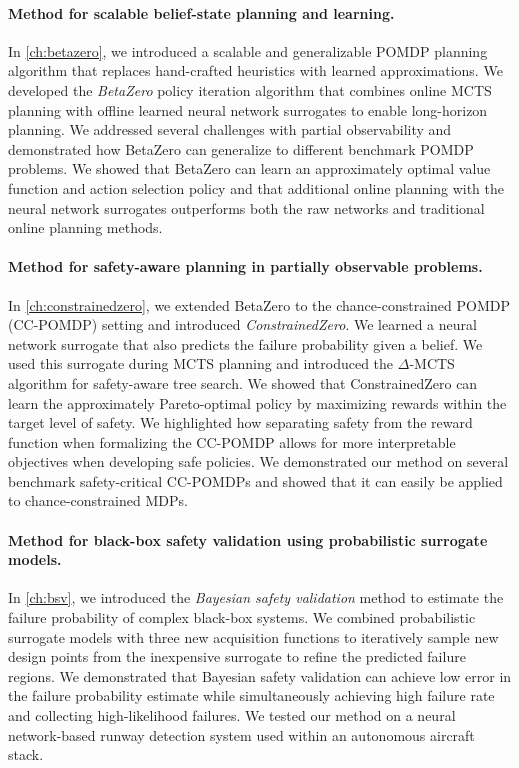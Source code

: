 \paragraph{Method for scalable belief-state planning and learning.}
In \cref{ch:betazero}, we introduced a scalable and generalizable POMDP planning algorithm that replaces hand-crafted heuristics with learned approximations.
We developed the \textit{BetaZero} policy iteration algorithm that combines online MCTS planning with offline learned neural network surrogates to enable long-horizon planning.
We addressed several challenges with partial observability and demonstrated how BetaZero can generalize to different benchmark POMDP problems.
We showed that BetaZero can learn an approximately optimal value function and action selection policy and that additional online planning with the neural network surrogates outperforms both the raw networks and traditional online planning methods.


\paragraph{Method for safety-aware planning in partially observable problems.}
In \cref{ch:constrainedzero}, we extended BetaZero to the chance-constrained POMDP (CC-POMDP) setting and introduced \textit{ConstrainedZero}.
We learned a neural network surrogate that also predicts the failure probability given a belief.
We used this surrogate during MCTS planning and introduced the $\Delta$-MCTS algorithm for safety-aware tree search.
We showed that ConstrainedZero can learn the approximately Pareto-optimal policy by maximizing rewards within the target level of safety.
We highlighted how separating safety from the reward function when formalizing the CC-POMDP allows for more interpretable objectives when developing safe policies.
We demonstrated our method on several benchmark safety-critical CC-POMDPs and showed that it can easily be applied to chance-constrained MDPs.


\paragraph{Method for black-box safety validation using probabilistic surrogate models.}
In \cref{ch:bsv}, we introduced the \textit{Bayesian safety validation} method to estimate the failure probability of complex black-box systems.
We combined probabilistic surrogate models with three new acquisition functions to iteratively sample new design points from the inexpensive surrogate to refine the predicted failure regions.
We demonstrated that Bayesian safety validation can achieve low error in the failure probability estimate while simultaneously achieving high failure rate and collecting high-likelihood failures.
We tested our method on a neural network-based runway detection system used within an autonomous aircraft stack.


